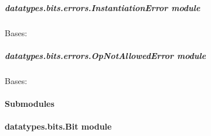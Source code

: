 \documentclass[letterpaper,10pt,english]{sphinxmanual}
\begin{document}
\subparagraph{datatypes.bits.errors.InstantiationError module}
\label{datatypes.bits.errors:datatypes-bits-errors-instantiationerror-module}\label{datatypes.bits.errors:module-datatypes.bits.errors.InstantiationError}

\begin{fulllineitems}
\label{datatypes.bits.errors:datatypes.bits.errors.InstantiationError.InstantiationError}
Bases: 

\end{fulllineitems}



\subparagraph{datatypes.bits.errors.OpNotAllowedError module}
\label{datatypes.bits.errors:datatypes-bits-errors-opnotallowederror-module}\label{datatypes.bits.errors:module-datatypes.bits.errors.OpNotAllowedError}

\begin{fulllineitems}
\label{datatypes.bits.errors:datatypes.bits.errors.OpNotAllowedError.OpNotAllowedError}
Bases: 

\end{fulllineitems}



\paragraph{Submodules}
\label{datatypes.bits:submodules}

\paragraph{datatypes.bits.Bit module}
\label{datatypes.bits:module-datatypes.bits.Bit}\label{datatypes.bits:datatypes-bits-bit-module}
\end{document}
